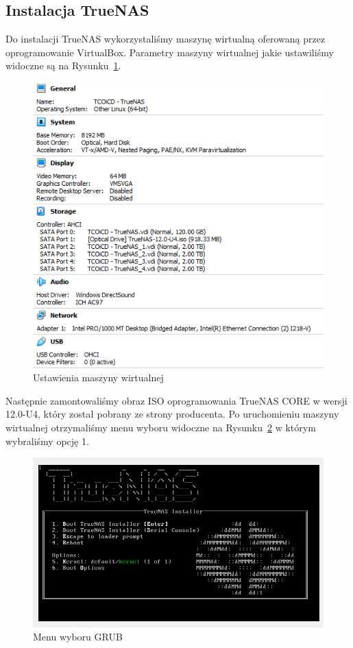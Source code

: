\documentclass[12pt,a4paper]{article}
\newcommand{\<}{\langle}
\renewcommand{\>}{\rangle}
\theoremstyle{definition}
\begin{document}
\subsection{Instalacja TrueNAS}

Do instalacji TrueNAS wykorzystaliśmy maszynę wirtualną oferowaną przez oprogramowanie VirtualBox. Parametry maszyny wirtualnej jakie ustawiliśmy widoczne są na Rysunku~\ref{vb_settings}.

\begin{figure}[H]
    \centering
    \includegraphics[width=\linewidth]{img/ss_truenas/1.png}
    \caption{Ustawienia maszyny wirtualnej}
    \label{vb_settings}
\end{figure}

Następnie zamontowaliśmy obraz ISO oprogramowania TrueNAS CORE w wersji 12.0-U4, który został pobrany ze strony producenta. Po uruchomieniu maszyny wirtualnej otrzymaliśmy menu wyboru widoczne na Rysunku~\ref{grub} w którym wybraliśmy opcję 1.

\begin{figure}[H]
    \centering
    \includegraphics[width=14cm]{img/ss_truenas/2.png}
    \caption{Menu wyboru GRUB}
    \label{grub}
\end{figure}
\end{document}
